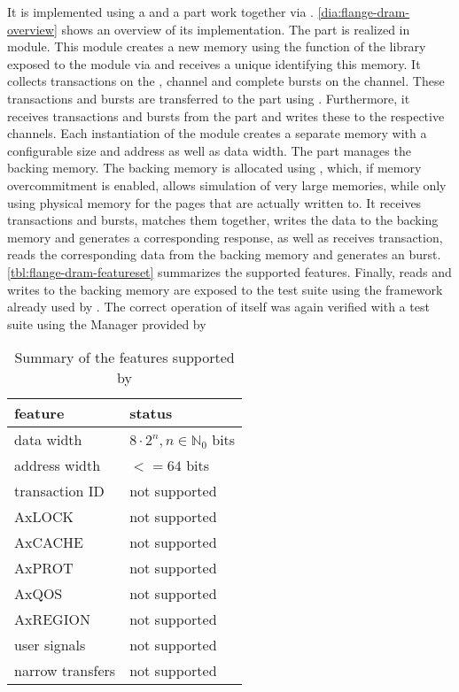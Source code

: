 It is implemented using a \systemverilog{} and a \cpp{} part work together via \DPI{}. \autoref{dia:flange-dram-overview} shows an overview of its implementation. The \systemverilog{} part is realized in  module. This module creates a new memory using the  function of the \flangedram{} library exposed to the module via \DPI{} and receives a unique  identifying this memory. It collects transactions on the \AW{}, \AR{} \AXI{} channel and complete bursts on the \W{} \AXI{} channel. These transactions and bursts are transferred to the \cpp{} part using \DPI{}. Furthermore, it receives \B{} transactions and \R{} bursts from the \cpp{} part and writes these to the respective \AXI{} channels. Each instantiation of the  module creates a separate memory with a configurable size and address as well as data width.
The \cpp{} part manages the backing memory. The backing memory is allocated using \mmap{}, which, if memory overcommitment is enabled, allows simulation of very large memories, while only using physical memory for the pages that are actually written to. It receives \AW{} transactions and \W{} bursts, matches them together, writes the data to the backing memory and generates a corresponding \B{} response, as well as receives \AR{} transaction, reads the corresponding data from the backing memory and generates an \R{} burst. \autoref{tbl:flange-dram-featureset} summarizes the supported \AXI{} features. Finally, reads and writes to the backing memory are exposed to the test suite using the \RCF{} framework already used by \flange{}.
The correct operation of \flangedram{} itself was again verified with a test suite using the \AXI{} Manager provided by \cocotb{}

\begin{table}
  \begin{center}
\begin{tabular}{ll}
  \toprule
  feature & status \\
  \midrule
  data width & $8 · 2^{n}, n ∈ ℕ_{0}$ bits \\
  address width & $<= 64$ bits \\
  transaction ID & not supported \\
  AxLOCK & not supported \\
  AxCACHE & not supported \\
  AxPROT & not supported \\
  AxQOS & not supported \\
  AxREGION & not supported \\
  user signals & not supported \\
  narrow transfers & not supported \\
  \bottomrule
\end{tabular}
  \end{center}
\caption{Summary of the \AXI{} features supported by \flangedram}\label{tbl:flange-dram-featureset}
\end{table}

